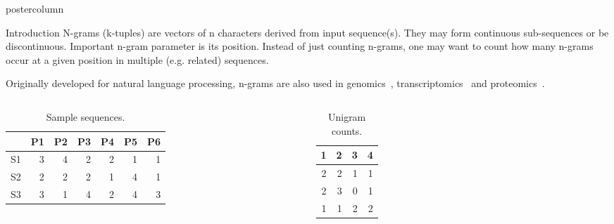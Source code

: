 \documentclass[final]{beamer}\usepackage[]{graphicx}\usepackage[]{color}
\newlength{\columnheight}
\begin{document}
\begin{frame}
  \begin{columns}
    \begin{column}{.49\textwidth}
      \begin{beamercolorbox}[center,wd=\textwidth]{postercolumn}
        \begin{minipage}[T]{.95\textwidth}
          \parbox[t][\columnheight]{\textwidth}
            {
    
        
    \begin{block}{Introduction}
N-grams (k-tuples) are vectors of n characters derived from input sequence(s). They may form continuous sub-sequences or be discontinuous. 
Important n-gram parameter is its position. Instead of just counting n-grams, one may want to count how many n-grams occur at a given position in multiple (e.g. related) sequences.

Originally developed for natural language processing, n-grams are also used in genomics~\citep{fang2011}, transcriptomics~\citep{wang2014} and proteomics~\citep{guo2014}.

\small{
       \begin{columns}[c] %
\begin{table}[ht]
\centering
\begin{tabular}{rrrrrrr}
  \hline
 & P1 & P2 & P3 & P4 & P5 & P6 \\ 
  \hline
S1 & 3 & 4 & 2 & 2 & 1 & 1 \\ 
  S2 & 2 & 2 & 2 & 1 & 4 & 1 \\ 
  S3 & 3 & 1 & 4 & 2 & 4 & 3 \\ 
   \hline
\end{tabular}
\caption{Sample sequences.} 
\end{table}

      
      

    
\begin{table}[ht]
\centering
\begin{tabular}{rrrr}
  \hline
1 & 2 & 3 & 4 \\ 
  \hline
2 & 2 & 1 & 1 \\ 
  2 & 3 & 0 & 1 \\ 
  1 & 1 & 2 & 2 \\ 
   \hline
\end{tabular}
\caption{Unigram counts.} 
\end{table}



\end{columns}}
\end{block}}
\end{minipage}
\end{beamercolorbox}
\end{column}
\end{columns}
\end{frame}
\end{document}
